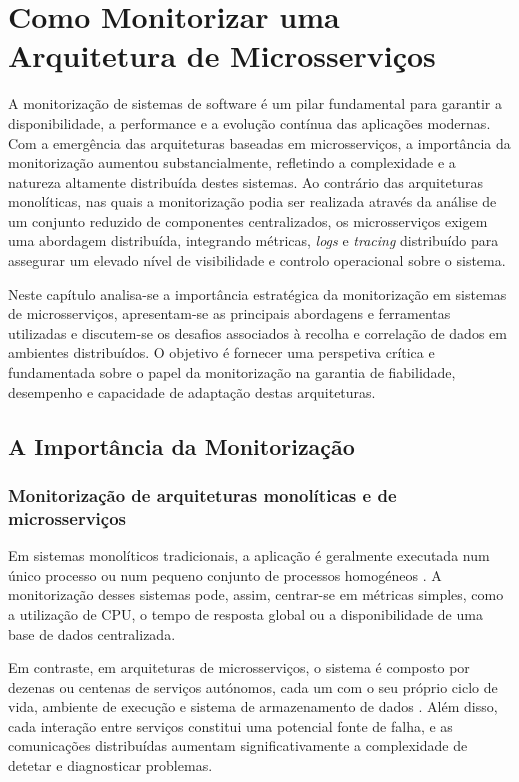 \chapter{Como Monitorizar uma Arquitetura de Microsserviços }

A monitorização de sistemas de software é um pilar fundamental para garantir a disponibilidade, a performance e a evolução contínua das aplicações modernas. Com a emergência das arquiteturas baseadas em microsserviços, a importância da monitorização aumentou substancialmente, refletindo a complexidade e a natureza altamente distribuída destes sistemas. Ao contrário das arquiteturas monolíticas, nas quais a monitorização podia ser realizada através da análise de um conjunto reduzido de componentes centralizados, os microsserviços exigem uma abordagem distribuída, integrando métricas, \textit{logs} e \textit{tracing} distribuído para assegurar um elevado nível de visibilidade e controlo operacional sobre o sistema.

Neste capítulo analisa-se a importância estratégica da monitorização em sistemas de microsserviços, apresentam-se as principais abordagens e ferramentas utilizadas e discutem-se os desafios associados à recolha e correlação de dados em ambientes distribuídos. O objetivo é fornecer uma perspetiva crítica e fundamentada sobre o papel da monitorização na garantia de fiabilidade, desempenho e capacidade de adaptação destas arquiteturas.


\section{A Importância da Monitorização}

\subsection{Monitorização de arquiteturas monolíticas e de microsserviços}

Em sistemas monolíticos tradicionais, a aplicação é geralmente executada num único processo ou num pequeno conjunto de processos homogéneos \cite{Villamizar2015}. A monitorização desses sistemas pode, assim, centrar-se em métricas simples, como a utilização de CPU, o tempo de resposta global ou a disponibilidade de uma base de dados centralizada. 

Em contraste, em arquiteturas de microsserviços, o sistema é composto por dezenas ou centenas de serviços autónomos, cada um com o seu próprio ciclo de vida, ambiente de execução e sistema de armazenamento de dados \cite{Newman2015}. Além disso, cada interação entre serviços constitui uma potencial fonte de falha, e as comunicações distribuídas aumentam significativamente a complexidade de detetar e diagnosticar problemas. 


